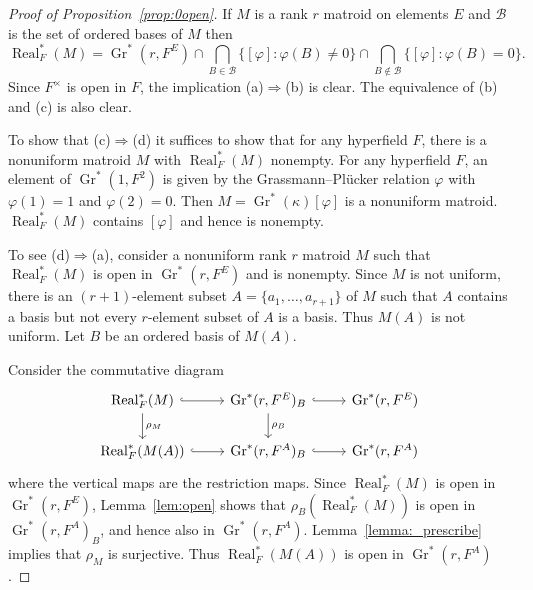\documentclass[10pt, preprint]{article}
\theoremstyle{definition}
\begin{document}
\begin{proof}[Proof of Proposition~\ref{prop:0open}]
If $M$ is a rank $r$ matroid on elements $E$ and $\mathcal B$ is the set of
ordered bases of $M$ then
%
\begin{equation*}
\operatorname{Real}^{*}_{F}(M)=\operatorname{Gr}^{*}(r, F^{E}) \cap
\bigcap _{B\in {\mathcal B}} \{[\varphi ] : \varphi (B)\neq 0\}
\cap
\bigcap _{B\notin {\mathcal B}} \{[\varphi ]: \varphi (B) = 0\}.
\end{equation*}
%
Since $F^{\times }$ is open in $F$, the implication (a)$\Rightarrow $(b)
is clear. The equivalence of (b) and (c) is also clear.

To show that (c)$\Rightarrow $(d) it suffices to show that for any
hyperfield $F$, there is a nonuniform matroid $M$ with $
\operatorname{Real}_{F}^{*}(M)$ nonempty. For any hyperfield $F$, an
element of $\operatorname{Gr}^{*}(1,F^{2})$ is given by the
Grassmann--Pl\"{u}cker relation $\varphi $ with $\varphi (1) = 1$ and
$\varphi (2) = 0$. Then $M = \operatorname{Gr}^{*}(\kappa ) [\varphi
]$ is a nonuniform matroid. $\operatorname{Real}_{F}^{*}(M)$ contains
$[\varphi ]$ and hence is nonempty.

To see (d)$\Rightarrow $(a), consider a nonuniform rank $r$ matroid
$M$ such that $\operatorname{Real}^{*}_{F}(M)$ is open in $
\operatorname{Gr}^{*}(r, F^{E})$ and is nonempty. Since $M$ is not
uniform, there is an $(r+1)$-element subset $A = \{a_{1}, \dots , a
_{r+1}\}$ of $M$ such that $A$ contains a basis but not every
$r$-element subset of $A$ is a basis. Thus $M(A)$ is not uniform. Let
$B$ be an ordered basis of $M(A)$.

Consider the commutative diagram
%
\begin{equation*}
%
\begin{tikzcd}
\operatorname{Real} ^*_F(M) \arrow[d,"\rho _M"] \arrow[r,hook] & \operatorname{Gr} ^*(r,F^E)_B
\arrow[d,"\rho _B"] \arrow[r,hook] & \operatorname{Gr} ^*(r,F^E) \\
\operatorname{Real} ^*_F(M(A)) \arrow[r,hook] & \operatorname{Gr} ^*(r,F^A)_B \arrow[r,hook] &
\operatorname{Gr} ^*(r,F^A)
\end{tikzcd}
%
\end{equation*}
%
where the vertical maps are the restriction maps. Since $
\operatorname{Real}^{*}_{F}(M)$ is open in $\operatorname{Gr}^{*}(r,F
^{E})$, Lemma~\ref{lem:open} shows that $\rho _{B}(\operatorname{Real}
^{*}_{F}(M))$ is open in $\operatorname{Gr}^{*}(r,F^{A})_{B}$, and hence
also in $\operatorname{Gr}^{*}(r,F^{A})$. Lemma~\ref{lemma:_prescribe}
implies that $\rho _{M}$ is surjective. Thus $\operatorname{Real}_{F}
^{*}(M(A))$ is open in $\operatorname{Gr}^{*}(r, F^{A})$.


\end{proof}
\end{document}
